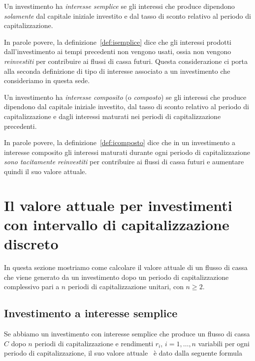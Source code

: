 \begin{defn}\label{def:isemplice}
  Un investimento ha \emph{interesse semplice} se gli interessi che produce dipendono \emph{solamente}
  dal capitale iniziale investito e dal tasso di sconto relativo al periodo di capitalizzazione.
\end{defn}

In parole povere, la definizione~\ref{def:isemplice} dice che gli interessi prodotti dall'investimento ai tempi
precedenti non vengono usati, ossia non vengono \emph{reinvestiti} per contribuire ai flussi di cassa futuri.
Questa considerazione ci porta alla seconda definizione di tipo di interesse associato a un investimento
che consideriamo in questa sede.

\begin{defn} \label{def:icomposto}
  Un investimento ha \emph{interesse composito} (o \emph{composto}) se gli interessi che produce dipendono
  dal capitale iniziale investito, dal tasso di sconto relativo al periodo di capitalizzazione e dagli interessi
  maturati nei periodi di capitalizzazione precedenti. 
\end{defn}

In parole povere, la definizione~\ref{def:icomposto} dice che in un investimento a interesse composito gli interessi
maturati durante ogni periodo di capitalizzazione \emph{sono tacitamente reinvestiti} per contribuire ai flussi di cassa
futuri e aumentare quindi il suo valore attuale.

\section[Intervallo di capitalizzazione discreto]{Il valore attuale per investimenti con intervallo di capitalizzazione discreto}
\label{sec:tdiscreti}

In questa sezione mostriamo come calcolare il valore attuale di un flusso di cassa che viene generato da un investimento 
dopo un periodo di capitalizzazione complessivo pari a $n$ periodi di capitalizzazione unitari, con $n\ge 2$.

\subsection{Investimento a interesse semplice}
\label{sec:isemplice_td}

Se abbiamo un investimento con interesse semplice che produce un flusso di cassa $C$ dopo $n$ periodi di capitalizzazione
e rendimenti $r_i$, $i= 1, \ldots, n$ variabili per ogni periodo di capitalizzazione, il suo valore attuale \VA\ è dato dalla
seguente formula

